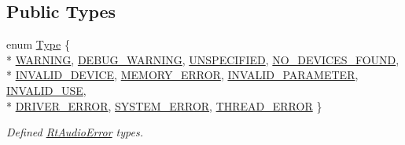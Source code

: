 \subsection*{Public Types}
\begin{DoxyCompactItemize}
\item 
enum \hyperlink{class_rt_audio_error_a85bdee746d5ba80d655ac98ded21d073}{Type} \{ \\*
\hyperlink{class_rt_audio_error_a85bdee746d5ba80d655ac98ded21d073a2a65138d7bfc0d837e190d83be652002}{W\+A\+R\+N\+I\+NG}, 
\hyperlink{class_rt_audio_error_a85bdee746d5ba80d655ac98ded21d073addec546de239cbe31eaf957aa788077e}{D\+E\+B\+U\+G\+\_\+\+W\+A\+R\+N\+I\+NG}, 
\hyperlink{class_rt_audio_error_a85bdee746d5ba80d655ac98ded21d073a395c8f5ff5e196c148308afa1b17b573}{U\+N\+S\+P\+E\+C\+I\+F\+I\+ED}, 
\hyperlink{class_rt_audio_error_a85bdee746d5ba80d655ac98ded21d073a57687b266b9bfa7fdc42d888f1f9d926}{N\+O\+\_\+\+D\+E\+V\+I\+C\+E\+S\+\_\+\+F\+O\+U\+ND}, 
\\*
\hyperlink{class_rt_audio_error_a85bdee746d5ba80d655ac98ded21d073a08b0619b94eecdb8a3c3b090d8f6071f}{I\+N\+V\+A\+L\+I\+D\+\_\+\+D\+E\+V\+I\+CE}, 
\hyperlink{class_rt_audio_error_a85bdee746d5ba80d655ac98ded21d073a274eea66f86a3a1a0a700558ebbe5c6b}{M\+E\+M\+O\+R\+Y\+\_\+\+E\+R\+R\+OR}, 
\hyperlink{class_rt_audio_error_a85bdee746d5ba80d655ac98ded21d073ab679b99ae82a7a0268c42171a590cd75}{I\+N\+V\+A\+L\+I\+D\+\_\+\+P\+A\+R\+A\+M\+E\+T\+ER}, 
\hyperlink{class_rt_audio_error_a85bdee746d5ba80d655ac98ded21d073a7df05d1bbec08e774640dd754616735e}{I\+N\+V\+A\+L\+I\+D\+\_\+\+U\+SE}, 
\\*
\hyperlink{class_rt_audio_error_a85bdee746d5ba80d655ac98ded21d073a4cb0d171bff6c85a6041ed8f394214af}{D\+R\+I\+V\+E\+R\+\_\+\+E\+R\+R\+OR}, 
\hyperlink{class_rt_audio_error_a85bdee746d5ba80d655ac98ded21d073ae255cae361eab840707fe48630ce5a17}{S\+Y\+S\+T\+E\+M\+\_\+\+E\+R\+R\+OR}, 
\hyperlink{class_rt_audio_error_a85bdee746d5ba80d655ac98ded21d073a9c9821fc9ab25a12b97c588efe01a7ba}{T\+H\+R\+E\+A\+D\+\_\+\+E\+R\+R\+OR}
 \}\begin{DoxyCompactList}\small\item\em Defined \hyperlink{class_rt_audio_error}{Rt\+Audio\+Error} types. \end{DoxyCompactList}
\end{DoxyCompactItemize}
